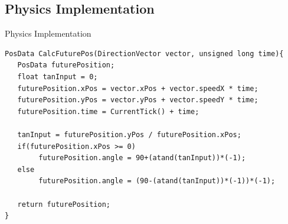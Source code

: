 \subsection{Physics Implementation}
\begin{frame}[fragile]{Physics Implementation}
\begin{minipage}[H]{0.9\linewidth}
 \begin{lstlisting}
PosData CalcFuturePos(DirectionVector vector, unsigned long time){
   PosData futurePosition;
   float tanInput = 0;
   futurePosition.xPos = vector.xPos + vector.speedX * time;
   futurePosition.yPos = vector.yPos + vector.speedY * time;
   futurePosition.time = CurrentTick() + time;

   tanInput = futurePosition.yPos / futurePosition.xPos;
   if(futurePosition.xPos >= 0)
        futurePosition.angle = 90+(atand(tanInput))*(-1);
   else
        futurePosition.angle = (90-(atand(tanInput))*(-1))*(-1);
   
   return futurePosition;
}
 \end{lstlisting} 
\end{minipage}
\end{frame}